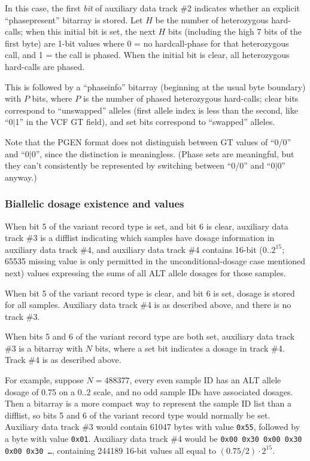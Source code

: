 \documentclass[8pt]{article}
\begin{document}
In this case, the first \textit{bit} of auxiliary data track \#2 indicates
whether an explicit ``phasepresent'' bitarray is stored.  Let $H$ be the number
of heterozygous hard-calls; when this initial bit is set, the next $H$ bits
(including the high 7 bits of the first byte) are 1-bit values where 0 = no
hardcall-phase for that heterozygous call, and 1 = the call is phased.  When
the initial bit is clear, all heterozygous hard-calls are phased.

This is followed by a ``phaseinfo'' bitarray (beginning at the usual byte
boundary) with $P$ bits, where $P$ is the number of phased heterozygous
hard-calls; clear bits correspond to ``unswapped'' alleles (first allele index
is less than the second, like ``0$|$1'' in the VCF GT field), and set bits
correspond to ``swapped'' alleles.

Note that the PGEN format does not distinguish between GT values of ``0/0'' and
``0$|$0'', since the distinction is meaningless.  (Phase sets are meaningful,
but they can't consistently be represented by switching between ``0/0'' and
``0$|$0'' anyway.)

\subsubsection{Biallelic dosage existence and values}

When bit 5 of the variant record type is set, and bit 6 is clear, auxiliary
data track \#3 is a difflist indicating which samples have dosage information
in auxiliary data track \#4, and auxiliary data track \#4 contains 16-bit
(0..$2^{15}$; 65535 missing value is only permitted in the unconditional-dosage
case mentioned next) values expressing the sums of all ALT allele dosages for
those samples.

When bit 5 of the variant record type is clear, and bit 6 is set, dosage is
stored for all samples.  Auxiliary data track \#4 is as described above, and
there is no track \#3.

When bits 5 and 6 of the variant record type are both set, auxiliary data track
\#3 is a bitarray with $N$ bits, where a set bit indicates a dosage in track
\#4.  Track \#4 is as described above.

For example, suppose $N=488377$, every even sample ID has an ALT allele dosage
of 0.75 on a 0..2 scale, and no odd sample IDs have associated dosages.  Then a
bitarray is a more compact way to represent the sample ID list than a difflist,
so bits 5 and 6 of the variant record type would normally be set.  Auxiliary
data track \#3 would contain 61047 bytes with value \texttt{0x55}, followed by
a byte with value \texttt{0x01}.  Auxiliary data track \#4 would be
\texttt{0x00 0x30 0x00 0x30 0x00 0x30 \ldots }, containing 244189 16-bit values
all equal to $(0.75/2)\cdot 2^{15}$.
\end{document}
